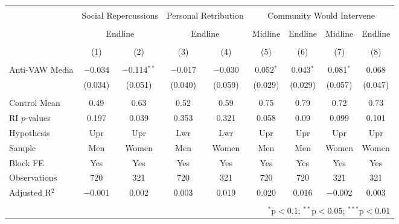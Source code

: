 
\begin{tabular}{@{\extracolsep{5pt}}lcccccccc} 
\\[-1.8ex]\hline 
\hline \\[-1.8ex] 
 & \multicolumn{2}{c}{Social Repercussions} & \multicolumn{2}{c}{Personal Retribution} & \multicolumn{4}{c}{Community Would Intervene} \\ 
\\[-1.8ex] & \multicolumn{2}{c}{Endline} & \multicolumn{2}{c}{Endline} & Midline & Endline & Midline & Endline \\ 
\\[-1.8ex] & (1) & (2) & (3) & (4) & (5) & (6) & (7) & (8)\\ 
\hline \\[-1.8ex] 
 Anti-VAW Media & $-$0.034 & $-$0.114$^{**}$ & $-$0.017 & $-$0.030 & 0.052$^{*}$ & 0.043$^{*}$ & 0.081$^{*}$ & 0.068 \\ 
  & (0.034) & (0.051) & (0.040) & (0.059) & (0.029) & (0.029) & (0.057) & (0.047) \\ 
 \hline \\[-1.8ex] 
Control Mean & 0.49 & 0.63 & 0.52 & 0.59 & 0.75 & 0.79 & 0.72 & 0.73 \\ 
RI $p$-values & 0.197 & 0.039 & 0.353 & 0.321 & 0.058 & 0.09 & 0.099 & 0.101 \\ 
Hypothesis & Upr & Upr & Lwr & Lwr & Upr & Upr & Upr & Upr \\ 
Sample & Men & Women & Men & Women & Men & Men & Women & Women \\ 
Block FE & Yes & Yes & Yes & Yes & Yes & Yes & Yes & Yes \\ 
Observations & 720 & 321 & 720 & 321 & 720 & 720 & 321 & 321 \\ 
Adjusted R$^{2}$ & $-$0.001 & 0.002 & 0.003 & 0.019 & 0.020 & 0.016 & $-$0.002 & 0.003 \\ 
\hline 
\hline \\[-1.8ex] 
\multicolumn{9}{r}{$^{*}$p$<$0.1; $^{**}$p$<$0.05; $^{***}$p$<$0.01} \\ 
\end{tabular} 
